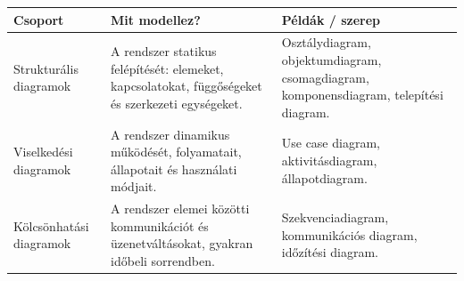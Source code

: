 \begin{tabularx}{\textwidth}{L{35mm}X X}
\toprule
\textbf{Csoport} & \textbf{Mit modellez?} & \textbf{Példák / szerep} \\
\midrule
Strukturális diagramok & A rendszer statikus felépítését: elemeket, kapcsolatokat, függőségeket és szerkezeti egységeket. & Osztálydiagram, objektumdiagram, csomagdiagram, komponensdiagram, telepítési diagram. \\
Viselkedési diagramok & A rendszer dinamikus működését, folyamatait, állapotait és használati módjait. & Use case diagram, aktivitásdiagram, állapotdiagram. \\
Kölcsönhatási diagramok & A rendszer elemei közötti kommunikációt és üzenetváltásokat, gyakran időbeli sorrendben. & Szekvenciadiagram, kommunikációs diagram, időzítési diagram. \\
\bottomrule
\end{tabularx}
